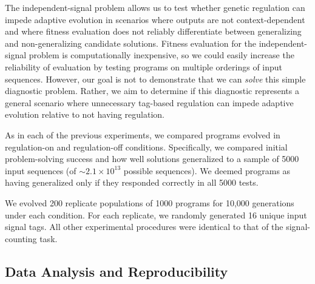 The independent-signal problem allows us to test whether genetic regulation can impede adaptive evolution in scenarios where outputs are not context-dependent and where fitness evaluation does not reliably differentiate between generalizing and non-generalizing candidate solutions.
Fitness evaluation for the independent-signal problem is computationally inexpensive, so we could easily increase the reliability of evaluation by testing programs on multiple orderings of input sequences.
However, our goal is not to demonstrate that we can \textit{solve} this simple diagnostic problem.
Rather, we aim to determine if this diagnostic represents a general scenario where unnecessary tag-based regulation can impede adaptive evolution relative to not having regulation. %

As in each of the previous experiments, we compared programs evolved in regulation-on and regulation-off conditions.
Specifically, we compared initial problem-solving success and how well solutions generalized to a sample of 5000 input sequences (of ${\sim}2.1\times10^{13}$ possible sequences). 
We deemed programs as having generalized only if they responded correctly in all 5000 tests.

We evolved 200 replicate populations of 1000 programs for 10,000 generations under each condition. 
For each replicate, we randomly generated 16 unique input signal tags.
All other experimental procedures were identical to that of the signal-counting task.


\subsection{Data Analysis and Reproducibility}


